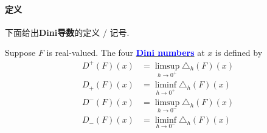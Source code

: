 \vspace{4em}
\paragraph{定义}
	下面给出\textbf{Dini导数}的定义 / 记号.
	\begin{defn}\label{def 4.5.1}
		Suppose $F$ is real-valued. The four \underline{\textcolor{blue}{\textbf{Dini numbers}}} at $x$ is defined by
		\begin{align}
			D^{+}(F)(x) &= \limsup_{h \to 0^{+}}{\triangle_{h}(F)(x)} \\
			D_{+}(F)(x) &= \liminf_{h \to 0^{+}}{\triangle_{h}(F)(x)} \\
			D^{-}(F)(x) &= \limsup_{h \to 0^{-}}{\triangle_{h}(F)(x)} \\
			D_{-}(F)(x) &= \liminf_{h \to 0^{-}}{\triangle_{h}(F)(x)} 
		\end{align}
	\end{defn}

\newpage
